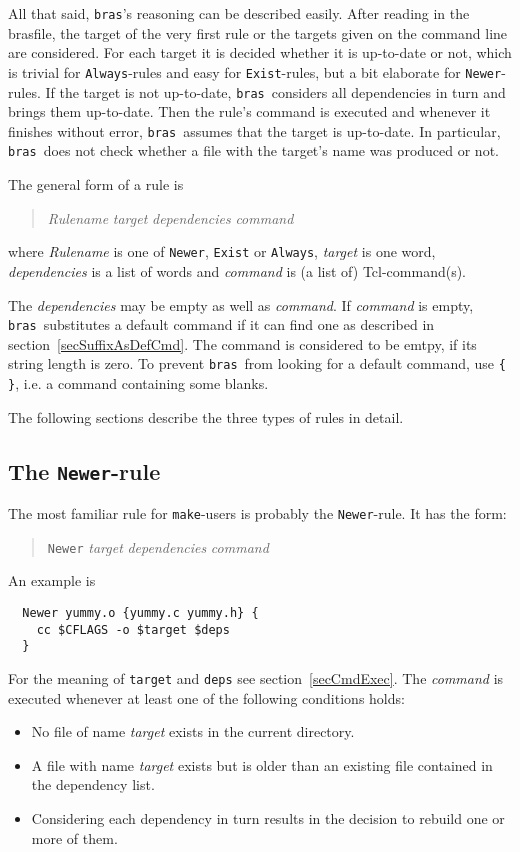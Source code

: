 \documentclass[12pt]{article}
\newcommand{\bras}{\texttt{bras}}
\newcommand{\make}{\texttt{make}}
\begin{document}
All that said, \bras's reasoning can be described easily.  After
reading in the brasfile, the target of the very first rule or the
targets given on the command line are considered. For each target it
is decided whether it is up-to-date or not, which is trivial for
\texttt{Always}-rules and easy for \texttt{Exist}-rules, but a bit
elaborate for \texttt{Newer}-rules. If the target is not up-to-date,
\bras\ considers all dependencies in turn and brings them
up-to-date. Then the rule's command is executed and whenever it
finishes without error, \bras\ assumes that the target is
up-to-date. In particular, \bras\ does not check whether a file with
the target's name was produced or not.

The general form of a rule is
\begin{quote}
\textit{Rulename} \textit{target} \textit{dependencies} \textit{command}
\end{quote}
where \textit{Rulename} is one of \texttt{Newer}, \texttt{Exist} or
\texttt{Always}, \textit{target} is one word, \textit{dependencies} is
a list of words and \textit{command} is (a list of) Tcl-command(s).

The \textit{dependencies} may be empty as well as \textit{command}. If
\textit{command} is empty, \bras\ substitutes a default command if it
can find one as described in section~\ref{secSuffixAsDefCmd}. The
command is considered to be emtpy, if its string length is zero. To
prevent \bras\ from looking for a default command, use \verb|{ }|,
i.e. a command containing some blanks.

The following sections describe the three types of rules in detail.

\subsection{The \texttt{Newer}-rule}
\label{secNewer}
The most familiar rule for \make-users is probably the
\texttt{Newer}-rule. It has the form:
\begin{quote}
  \texttt{Newer} \textit{target} \textit{dependencies} \textit{command}
\end{quote}
An example is
\begin{verbatim}
  Newer yummy.o {yummy.c yummy.h} {
    cc $CFLAGS -o $target $deps
  }
\end{verbatim}
For the meaning of \texttt{target} and \texttt{deps} see
section~\ref{secCmdExec}. 
The \textit{command} is executed whenever at least one of the
following conditions holds:
\begin{itemize}
\item No file of name \textit{target} exists in the current directory.
\item A file with name \textit{target} exists but is older than an
existing file contained in the dependency list.
\item Considering each dependency in turn results in the decision to
rebuild one or more of them.
\end{itemize}
\end{document}
